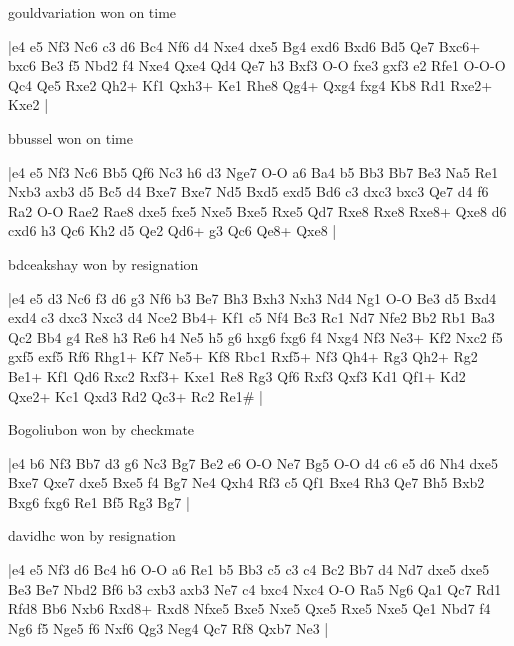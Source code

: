 \showboard

gouldvariation won on time

\makegametitle
|e4 e5 Nf3 Nc6 c3 d6 Bc4 Nf6 d4 Nxe4 dxe5 Bg4 exd6 Bxd6 Bd5 Qe7 Bxc6+ bxc6 Be3 f5 Nbd2 f4 Nxe4 Qxe4 Qd4 Qe7 h3 Bxf3 O-O fxe3 gxf3 e2 Rfe1 O-O-O Qc4 Qe5 Rxe2 Qh2+ Kf1 Qxh3+ Ke1 Rhe8 Qg4+ Qxg4 fxg4 Kb8 Rd1 Rxe2+ Kxe2  |

\showboard

bbussel won on time

\makegametitle
|e4 e5 Nf3 Nc6 Bb5 Qf6 Nc3 h6 d3 Nge7 O-O a6 Ba4 b5 Bb3 Bb7 Be3 Na5 Re1 Nxb3 axb3 d5 Bc5 d4 Bxe7 Bxe7 Nd5 Bxd5 exd5 Bd6 c3 dxc3 bxc3 Qe7 d4 f6 Ra2 O-O Rae2 Rae8 dxe5 fxe5 Nxe5 Bxe5 Rxe5 Qd7 Rxe8 Rxe8 Rxe8+ Qxe8 d6 cxd6 h3 Qc6 Kh2 d5 Qe2 Qd6+ g3 Qc6 Qe8+ Qxe8  |

\showboard

bdceakshay won by resignation

\makegametitle
|e4 e5 d3 Nc6 f3 d6 g3 Nf6 b3 Be7 Bh3 Bxh3 Nxh3 Nd4 Ng1 O-O Be3 d5 Bxd4 exd4 c3 dxc3 Nxc3 d4 Nce2 Bb4+ Kf1 c5 Nf4 Bc3 Rc1 Nd7 Nfe2 Bb2 Rb1 Ba3 Qc2 Bb4 g4 Re8 h3 Re6 h4 Ne5 h5 g6 hxg6 fxg6 f4 Nxg4 Nf3 Ne3+ Kf2 Nxc2 f5 gxf5 exf5 Rf6 Rhg1+ Kf7 Ne5+ Kf8 Rbc1 Rxf5+ Nf3 Qh4+ Rg3 Qh2+ Rg2 Be1+ Kf1 Qd6 Rxc2 Rxf3+ Kxe1 Re8 Rg3 Qf6 Rxf3 Qxf3 Kd1 Qf1+ Kd2 Qxe2+ Kc1 Qxd3 Rd2 Qc3+ Rc2 Re1\#  |

\showboard

Bogoliubon won by checkmate

\makegametitle
|e4 b6 Nf3 Bb7 d3 g6 Nc3 Bg7 Be2 e6 O-O Ne7 Bg5 O-O d4 c6 e5 d6 Nh4 dxe5 Bxe7 Qxe7 dxe5 Bxe5 f4 Bg7 Ne4 Qxh4 Rf3 c5 Qf1 Bxe4 Rh3 Qe7 Bh5 Bxb2 Bxg6 fxg6 Re1 Bf5 Rg3 Bg7  |

\showboard

davidhc won by resignation

\makegametitle
|e4 e5 Nf3 d6 Bc4 h6 O-O a6 Re1 b5 Bb3 c5 c3 c4 Bc2 Bb7 d4 Nd7 dxe5 dxe5 Be3 Be7 Nbd2 Bf6 b3 cxb3 axb3 Ne7 c4 bxc4 Nxc4 O-O Ra5 Ng6 Qa1 Qc7 Rd1 Rfd8 Bb6 Nxb6 Rxd8+ Rxd8 Nfxe5 Bxe5 Nxe5 Qxe5 Rxe5 Nxe5 Qe1 Nbd7 f4 Ng6 f5 Nge5 f6 Nxf6 Qg3 Neg4 Qc7 Rf8 Qxb7 Ne3  |

